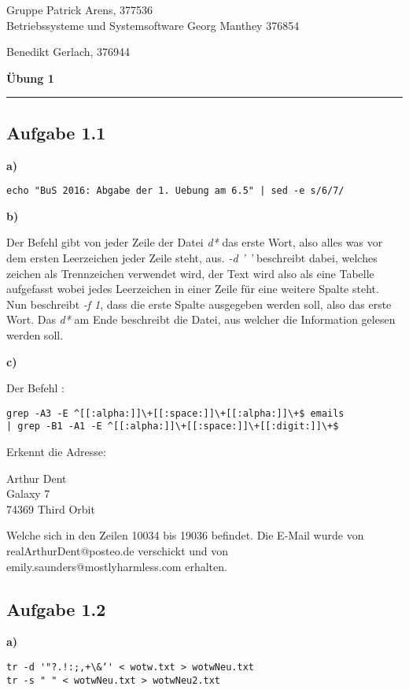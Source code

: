 \documentclass[a4paper,graphics,11pt]{article}
\newcommand{\aufgabe}[1]{\subsection*{Aufgabe #1}}
\begin{document}
\noindent Gruppe              \hfill Patrick Arens, 377536\\
\noindent Betriebssysteme und Systemsoftware    \hfill Georg Manthey 376854\\
\strut\hfill Benedikt Gerlach, 376944\\
\begin{center}
	\LARGE{\textbf{Übung 1}}
\end{center}
\begin{center}
\rule[0.1ex]{\textwidth}{1pt}
\end{center}

\aufgabe{1.1}
\textbf{a)}

\begin{verbatim}
echo "BuS 2016: Abgabe der 1. Uebung am 6.5" | sed -e s/6/7/
\end{verbatim}

\textbf{b)}

Der Befehl gibt von jeder Zeile der Datei \textit{d*} das erste Wort, also alles was vor dem ersten Leerzeichen jeder Zeile steht, aus. \textit{-d ' '} beschreibt dabei, welches zeichen als Trennzeichen verwendet wird, der Text wird also als eine Tabelle aufgefasst wobei jedes Leerzeichen in einer Zeile für eine weitere Spalte steht. Nun beschreibt \textit{-f 1}, dass die erste Spalte ausgegeben werden soll, also das erste Wort. Das \textit{d*} am Ende beschreibt die Datei, aus welcher die Information gelesen werden soll.


\textbf{c)}

Der Befehl :

\begin{verbatim}
grep -A3 -E ^[[:alpha:]]\+[[:space:]]\+[[:alpha:]]\+$ emails 
| grep -B1 -A1 -E ^[[:alpha:]]\+[[:space:]]\+[[:digit:]]\+$
\end{verbatim}



Erkennt die Adresse:

Arthur Dent\\
Galaxy 7\\
74369 Third Orbit

Welche sich in den Zeilen 10034 bis 19036 befindet. Die E-Mail wurde von realArthurDent@posteo.de verschickt und von emily.saunders@mostlyharmless.com erhalten.\\

\newpage

\aufgabe{1.2}
\textbf{a)}

\begin{verbatim}
tr -d '"?.!:;,+\&‘' < wotw.txt > wotwNeu.txt
tr -s " " < wotwNeu.txt > wotwNeu2.txt
\end{verbatim}
\end{document}
